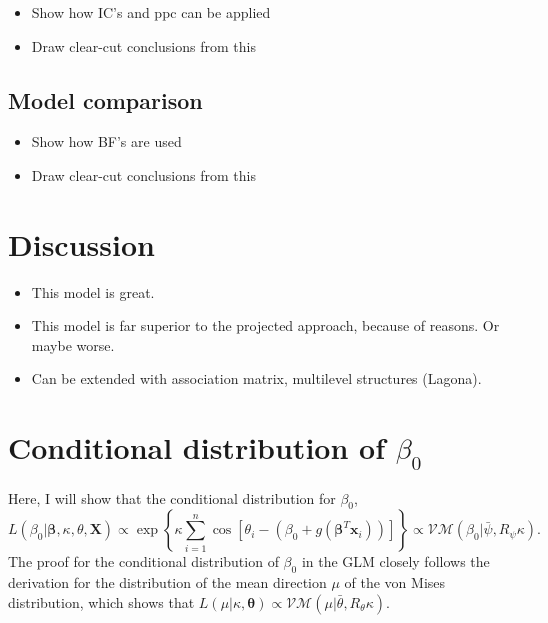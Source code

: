\documentclass[12pt,a4paper]{article}\usepackage[]{graphicx}\usepackage[]{color}
\begin{document}
\begin{itemize}
\item Show how IC's and ppc can be applied
\item Draw clear-cut conclusions from this
\end{itemize}

\subsection{Model comparison}

\begin{itemize}
\item Show how BF's are used
\item Draw clear-cut conclusions from this
\end{itemize}

\section{Discussion}

\begin{itemize}
\item This model is great.
\item This model is far superior to the projected approach, because of reasons. Or maybe worse.
\item Can be extended with association matrix, multilevel structures (Lagona).
\end{itemize}







\appendix

\section{Conditional distribution of $\beta_0$} \label{beta0}

Here, I will show that the conditional distribution for $\beta_0$,
$$ L(\beta_0 \vert \boldsymbol\beta, \kappa, \theta, \boldsymbol{X}) \propto \exp \left\lbrace \kappa \sum_{i=1}^n \cos \left[ \theta_i - (\beta_0 + g(\boldsymbol\beta^T \boldsymbol{x}_i)) \right]  \right\rbrace \propto \mathcal{VM}(\beta_0 \vert \bar\psi, R_{\psi}\kappa). $$
The proof for the conditional distribution of $\beta_0$ in the GLM closely follows the derivation for the distribution of the mean direction $\mu$ of the von Mises distribution, which shows that $L(\mu \vert \kappa, \boldsymbol\theta) \propto \mathcal{VM}(\mu \vert \bar\theta, R_{\theta} \kappa)$.
\end{document}
